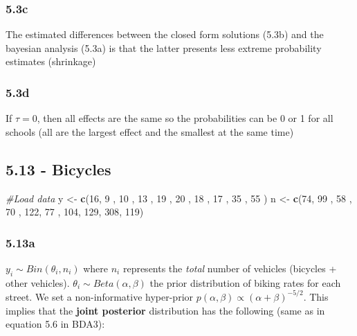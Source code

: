\documentclass[]{article}
\newenvironment{Shaded}{\begin{snugshade}}{\end{snugshade}}
\newcommand{\KeywordTok}[1]{\textcolor[rgb]{0.13,0.29,0.53}{\textbf{#1}}}
\newcommand{\DecValTok}[1]{\textcolor[rgb]{0.00,0.00,0.81}{#1}}
\newcommand{\StringTok}[1]{\textcolor[rgb]{0.31,0.60,0.02}{#1}}
\newcommand{\CommentTok}[1]{\textcolor[rgb]{0.56,0.35,0.01}{\textit{#1}}}
\newcommand{\NormalTok}[1]{#1}
\begin{document}
\subsubsection{5.3c}\label{c-2}

The estimated differences between the closed form solutions (5.3b) and
the bayesian analysis (5.3a) is that the latter presents less extreme
probability estimates (shrinkage)

\subsubsection{5.3d}\label{d-1}

If \(\tau = 0\), then all effects are the same so the probabilities can
be 0 or 1 for all schools (all are the largest effect and the smallest
at the same time)

\subsection{5.13 - Bicycles}\label{bicycles}

\begin{Shaded}
\begin{Highlighting}[]
\CommentTok{#Load data}
\NormalTok{y                <-}\StringTok{ }\KeywordTok{c}\NormalTok{(}\DecValTok{16}\NormalTok{, }\DecValTok{9}\NormalTok{  , }\DecValTok{10}\NormalTok{ , }\DecValTok{13}\NormalTok{ , }\DecValTok{19}\NormalTok{ , }\DecValTok{20}\NormalTok{ , }\DecValTok{18}\NormalTok{ , }\DecValTok{17}\NormalTok{ , }\DecValTok{35}\NormalTok{ , }\DecValTok{55}\NormalTok{ )}
\NormalTok{n                <-}\StringTok{ }\KeywordTok{c}\NormalTok{(}\DecValTok{74}\NormalTok{, }\DecValTok{99}\NormalTok{ , }\DecValTok{58}\NormalTok{ , }\DecValTok{70}\NormalTok{ , }\DecValTok{122}\NormalTok{, }\DecValTok{77}\NormalTok{ , }\DecValTok{104}\NormalTok{, }\DecValTok{129}\NormalTok{, }\DecValTok{308}\NormalTok{, }\DecValTok{119}\NormalTok{)}
\end{Highlighting}
\end{Shaded}

\subsubsection{5.13a}\label{a-4}

\(y_{i}\sim Bin(\theta_{i},n_{i})\) where \(n_{i}\) represents the
\emph{total} number of vehicles (bicycles + other vehicles).
\(\theta_{i}\sim Beta(\alpha,\beta)\) the prior distribution of biking
rates for each street. We set a non-informative hyper-prior
\(p(\alpha,\beta) \propto (\alpha + \beta)^{-5/2}\). This implies that
the \textbf{joint posterior} distribution has the following (same as in
equation 5.6 in BDA3):
\end{document}
